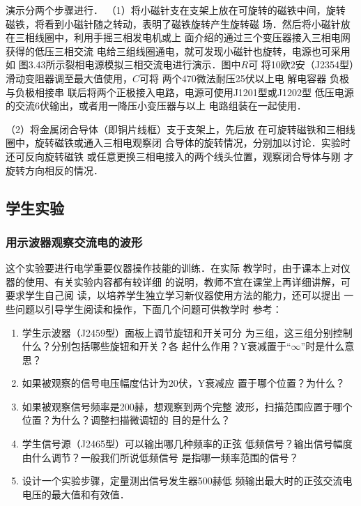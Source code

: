 演示分两个步骤进行．
（1）将小磁针支在支架上放在可旋转的磁铁中间，旋转
磁铁，将看到小磁针随之转动，表明了磁铁旋转产生旋转磁
场．然后将小磁针放在三相线圈中，利用手摇三相发电机或上
面介绍的通过三个变压器接入三相电网获得的低压三相交流
电给三组线圈通电，就可发现小磁针也旋转，电源也可采用如
图3.43所示裂相电源模拟三相交流电进行演示．图中$R$可
将10欧2安（J2354型）滑动变阻器调至最大值使用，$C$可将
两个470微法耐压25伏以上电 解电容器 负极与负极相接串
联后将两个正极接入电路，电源可使用J1201型或J1202型
低压电源的交流6伏输出，或者用一降压小变压器与以上
电路组装在一起使用．

（2）将金属闭合导体（即铜片线框）支于支架上，先后放
在可旋转磁铁和三相线圈中，旋转磁铁或通入三相电观察闭
合导体的旋转情况，分别加以讨论．实验时还可反向旋转磁铁
或任意更换三相电接入的两个线头位置，观察闭合导体与刚
才旋转方向相反的情况．

\subsection{学生实验}
\subsubsection{用示波器观察交流电的波形}
这个实验要进行电学重要仪器操作技能的训练．在实际
教学时，由于课本上对仪器的使用、有关实验内容都有较详细
的说明，教师不宜在课堂上再详细讲解，可要求学生自己阅
读，以培养学生独立学习新仪器使用方法的能力，还可以提出
一些问题以引导学生阅读和操作，下面几个问题可供教学时
参考：
\begin{enumerate}
\item 学生示波器（J2459型）面板上调节旋钮和开关可分
为三组，这三组分别控制什么？分别包括哪些旋钮和开关？各
起什么作用？Y衰减置于“$\infty$”时是什么意思？
\item 如果被观察的信号电压幅度估计为20伏，Y衰减应
置于哪个位置？为什么？
\item 如果被观察信号频率是200赫，想观察到两个完整
波形，扫描范围应置于哪个位置？为什么？调整扫描微调钮的
目的是什么？
\item 学生信号源（J2465型）可以输出哪几种频率的正弦
低频信号？输出信号幅度由什么调节？一般我们所说低频信号
是指哪一频率范围的信号？
\item 设计一个实验步骤，定量测出信号发生器500赫低
频输出最大时的正弦交流电电压的最大值和有效值．
\end{enumerate}

